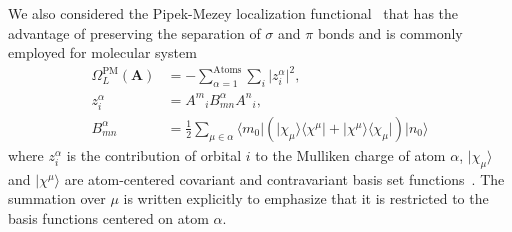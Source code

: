 \documentclass[aps,prl,reprint,amsmath,amssymb]{revtex4-1}
\newcommand{\ket}[1]{\ensuremath{\vert #1 \rangle}}
\newcommand{\bra}[1]{\ensuremath{\langle #1 \vert}}
\newcommand{\ketbra}[2]{\ensuremath{\vert #1 \rangle \langle #2 \vert}} %
\begin{document}
We also considered the Pipek-Mezey localization functional~\cite{pipek1989fast,lehtola2014pipek} that has the advantage of preserving the separation of $\sigma$ and $\pi$ bonds and is commonly employed for molecular system
%
\begin{equation} \label{eq:pipek}
\begin{split}
\Omega_L^{\text{PM}}(\mathbf{A}) &= - \sum_{\alpha=1}^{\text{Atoms}} \sum_i \vert z_{i}^{\alpha} \vert^2, \\
z_{i}^{\alpha} &= {A^m}_i B^{\alpha}_{mn} {A^n}_i, \\
B^{\alpha}_{mn} &= \frac{1}{2} \sum_{\mu \in \alpha} \bra{m_0}  \left( \ketbra{\chi_{\mu}}{\chi^{\mu}} + \ketbra{\chi^{\mu}}{\chi_{\mu}} \right) \ket{n_0}
\end{split}
\end{equation}
%
%
where $z_{i}^{\alpha}$ is the contribution of orbital $i$ to the Mulliken charge of atom $\alpha$, $\ket{\chi_\mu}$ and $\ket{\chi^\mu}$ are atom-centered covariant and contravariant basis set functions~\cite{silvestrelli1999maximally, berghold2000general}. The summation over $\mu$ is written explicitly to emphasize that it is restricted to the basis functions centered on atom $\alpha$. 

\end{document}
